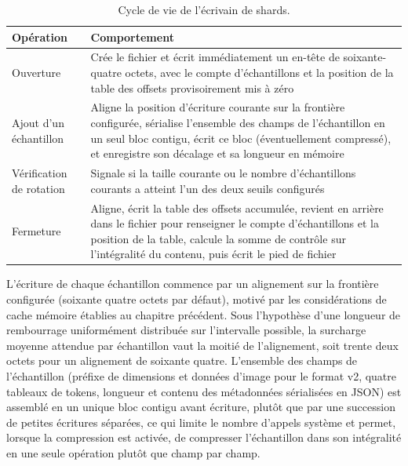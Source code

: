 \documentclass[12pt,a4paper]{report}
\begin{document}
\begin{table}[htbp]
  \centering
  \renewcommand{\arraystretch}{1.5}
  \begin{tabular}{|p{3.5cm}|p{11.5cm}|}
    \hline
    \textbf{Opération} & \textbf{Comportement} \\
    \hline
    Ouverture & Crée le fichier et écrit immédiatement un en-tête de soixante-quatre octets, avec le compte d'échantillons et la position de la table des offsets provisoirement mis à zéro \\
    \hline
    Ajout d'un échantillon & Aligne la position d'écriture courante sur la frontière configurée, sérialise l'ensemble des champs de l'échantillon en un seul bloc contigu, écrit ce bloc (éventuellement compressé), et enregistre son décalage et sa longueur en mémoire \\
    \hline
    Vérification de rotation & Signale si la taille courante ou le nombre d'échantillons courants a atteint l'un des deux seuils configurés \\
    \hline
    Fermeture & Aligne, écrit la table des offsets accumulée, revient en arrière dans le fichier pour renseigner le compte d'échantillons et la position de la table, calcule la somme de contrôle sur l'intégralité du contenu, puis écrit le pied de fichier \\
    \hline
  \end{tabular}
  \vspace{0.2cm}
  \caption{Cycle de vie de l'écrivain de shards.}
  \label{tab:shard_writer_api}
\end{table}

L'écriture de chaque échantillon commence par un alignement sur la frontière configurée (soixante quatre octets par défaut), motivé par les considérations de cache mémoire établies au chapitre précédent. Sous l'hypothèse d'une longueur de rembourrage uniformément distribuée sur l'intervalle possible, la surcharge moyenne attendue par échantillon vaut la moitié de l'alignement, soit trente deux octets pour un alignement de soixante quatre. L'ensemble des champs de l'échantillon (préfixe de dimensions et données d'image pour le format v2, quatre tableaux de tokens, longueur et contenu des métadonnées sérialisées en JSON) est assemblé en un unique bloc contigu avant écriture, plutôt que par une succession de petites écritures séparées, ce qui limite le nombre d'appels système et permet, lorsque la compression est activée, de compresser l'échantillon dans son intégralité en une seule opération plutôt que champ par champ.
\end{document}

